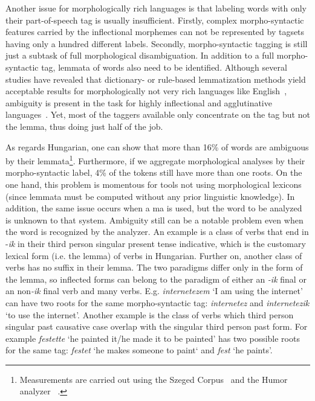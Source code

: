 Another issue for morphologically rich languages is that labeling words with only their part-of-speech tag is usually insufficient. 
Firstly, complex morpho-syntactic features carried by the inflectional morphemes can not be represented by tagsets having only a hundred different labels. 
Secondly, morpho-syntactic tagging is still just a subtask of full morphological disambiguation. 
In addition to a full morpho-syntactic tag, lemmata of words also need to be identified. Although several studies have revealed that dictionary- or rule-based lemmatization methods yield acceptable results for morphologically not very rich languages like English~\cite{Porter1980,Plisson2004}, ambiguity is present in the task for highly inflectional and agglutinative languages~\cite{Jursic2007,Sak2007,Chrupaa2008}. 
Yet, most of the taggers available only concentrate on the tag but not the lemma, thus doing just half of the job.

As regards Hungarian, one can show that more than 16\% of words are ambiguous by their lemmata\footnote{Measurements are carried out using the  Szeged Corpus~\cite{Csendes2004} and the Humor analyzer ~\cite{Proszeky1994,Novak2003,Proszeky2005}.}. 
Furthermore, if we aggregate morphological analyses by their morpho-syntactic label, 4\% of the tokens still have more than one roots. 
On the one hand, this problem is momentous for tools not using morphological lexicons (since lemmata must be computed without any prior linguistic knowledge). 
In addition, the same issue occurs when a \acrshort{ma} is used, but the word to be analyzed is unknown to that system.
Ambiguity still can be a notable problem even when the word is recognized by the analyzer.
An example is a class of verbs that end in -\emph{ik} in their third person singular present tense indicative, which is the customary lexical form (i.e. the lemma) of verbs in Hungarian. Further on, another class of verbs has no suffix in their lemma. 
The two paradigms differ only in the form of the lemma, so inflected forms can belong to the paradigm of either an \emph{-ik} final or an non\emph{-ik} final verb and many verbs. 
E.g. \emph{internetezem} `I am using the internet' can have two roots for the same morpho-syntactic tag: \emph{internetez} and \emph{internetezik} `to use the internet'.
Another example is the class of verbs which third person singular past causative case overlap with the singular third person past form. 
For example \emph{festette} `he painted it/he made it to be painted' has two possible roots for the same tag: \emph{festet} `he makes someone to paint` and \emph{fest} `he paints'.  %

